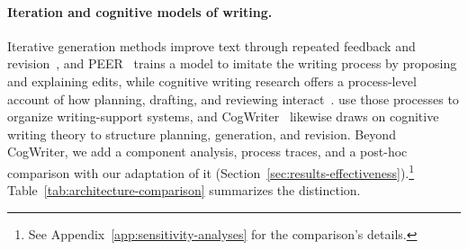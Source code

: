 \paragraph{Iteration and cognitive models of writing.}
Iterative generation methods improve text through repeated feedback and revision~\citep{madaan2023self,du2022iterative}, and PEER~\citep{schick2023peer} trains a model to imitate the writing process by proposing and explaining edits, while cognitive writing research offers a process-level account of how planning, drafting, and reviewing interact~\citep{flower1981cognitive,hayes1996new,hayes2012modeling}.
\citet{gero2022design} use those processes to organize writing-support systems, and CogWriter~\citep{wan2025cognitive} likewise draws on cognitive writing theory to structure planning, generation, and revision.
Beyond CogWriter, we add a component analysis, process traces, and a post-hoc comparison with our adaptation of it (Section~\ref{sec:results-effectiveness}).\footnote{See Appendix~\ref{app:sensitivity-analyses} for the comparison's details.}
Table~\ref{tab:architecture-comparison} summarizes the distinction.


